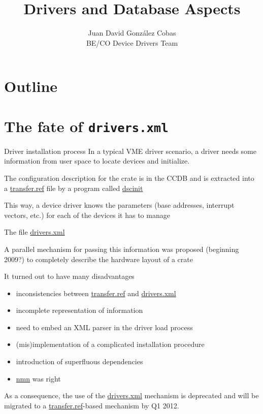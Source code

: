 \documentclass[compress,red]{beamer}
\title{Drivers and Database Aspects}
\author{Juan David Gonz\'alez Cobas\\
	BE/CO Device Drivers Team}
\begin{document}
\begin{frame}
\titlepage
\end{frame}

\section*{Outline}
\begin{frame}
\tableofcontents
\end{frame}

\section{The fate of \texttt{drivers.xml}}

\begin{frame}{Driver installation process}
In a typical VME driver scenario, a driver needs some information from
user space to locate devices and initialize.

The configuration description for the crate is in the CCDB and is
extracted into a \url{transfer.ref} file by a program called
\url{dscinit}

This way, a device driver knows the parameters (base addresses,
interrupt vectors, etc.) for each of the devices it has to manage
\end{frame}

\begin{frame}{The file \url{drivers.xml}}

A parallel mechanism for passing this information was proposed
(beginning 2009?) to completely describe the hardware layout of a crate

It turned out to have many disadvantages

\begin{itemize}
\item inconsistencies between \url{transfer.ref} and \url{drivers.xml}
\item incomplete representation of information
\item need to embed an XML parser in the driver load process
\item (mis)implementation of a complicated installation procedure
\item introduction of superfluous dependencies
\item \url{nmn} was right
\end{itemize}

As a consequence, the use of the \url{drivers.xml} mechanism is
deprecated and will be migrated to a \url{transfer.ref}-based
mechanism by Q1 2012.
\end{frame}
\end{document}
